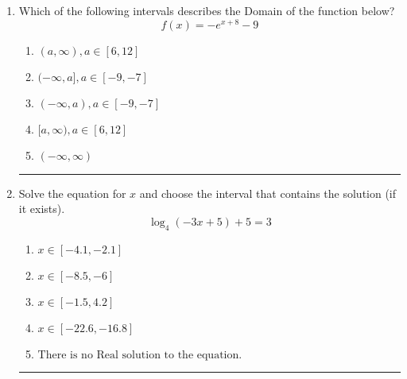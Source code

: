 \documentclass[14pt]{extbook}
\newcommand{\litem}[1]{\item#1\hspace*{-1cm}\rule{\textwidth}{0.4pt}}
\begin{document}
\begin{enumerate}
{\begin{enumerate}[label=\Alph*.]
\end{enumerate} }
\litem{
Which of the following intervals describes the Domain of the function below?\[ f(x) = -e^{x+8}-9 \]\begin{enumerate}[label=\Alph*.]
\item \( (a, \infty), a \in [6, 12] \)
\item \( (-\infty, a], a \in [-9, -7] \)
\item \( (-\infty, a), a \in [-9, -7] \)
\item \( [a, \infty), a \in [6, 12] \)
\item \( (-\infty, \infty) \)

\end{enumerate} }
\litem{
Solve the equation for $x$ and choose the interval that contains the solution (if it exists).\[ \log_{4}{(-3x+5)}+5 = 3 \]\begin{enumerate}[label=\Alph*.]
\item \( x \in [-4.1, -2.1] \)
\item \( x \in [-8.5, -6] \)
\item \( x \in [-1.5, 4.2] \)
\item \( x \in [-22.6, -16.8] \)
\item \( \text{There is no Real solution to the equation.} \)

\end{enumerate} }
\end{enumerate}
\end{document}
